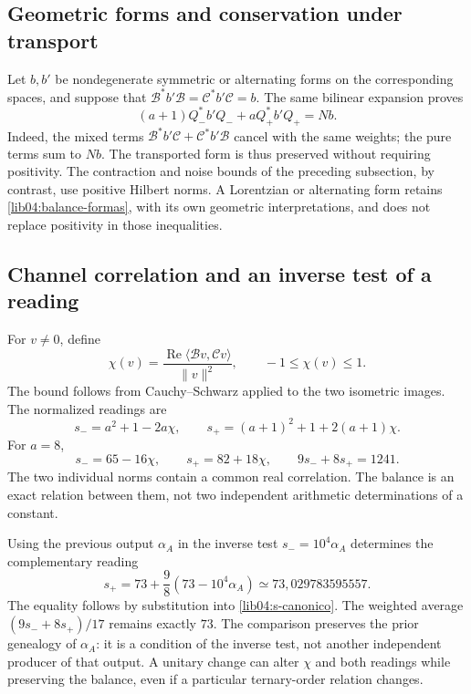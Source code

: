 \subsection{Geometric forms and conservation under transport}
\label{lib04:formas}

Let \(b,b'\) be nondegenerate symmetric or alternating forms on
the corresponding spaces, and suppose that
\(\mathcal B^*b'\mathcal B=\mathcal C^*b'\mathcal C=b\).
The same bilinear expansion proves
\begin{equation}
 (a+1)Q_-^*b'Q_-+aQ_+^*b'Q_+=Nb.
 \label{lib04:balance-formas}
\end{equation}
Indeed, the mixed terms
\(\mathcal B^*b'\mathcal C+\mathcal C^*b'\mathcal B\) cancel
with the same weights; the pure terms sum to \(Nb\).
The transported form is thus preserved without requiring positivity.
The contraction and noise bounds of the preceding subsection, by
contrast, use positive Hilbert norms. A Lorentzian or alternating
form retains \eqref{lib04:balance-formas}, with its own geometric
interpretations, and does not replace positivity in those
inequalities.

\subsection{Channel correlation and an inverse test of a reading}
\label{lib04:correlacion}

For \(v\neq0\), define
\begin{equation}
 \chi(v)=\frac{\operatorname{Re}\langle\mathcal Bv,\mathcal Cv\rangle}
                      {\|v\|^2},\qquad -1\leq\chi(v)\leq1.
 \label{lib04:chi}
\end{equation}
The bound follows from Cauchy--Schwarz applied to the two isometric images.
The normalized readings are
\begin{equation}
 s_-=a^2+1-2a\chi,\qquad
 s_+=(a+1)^2+1+2(a+1)\chi.
 \label{lib04:s-pm}
\end{equation}
For \(a=8\),
\begin{equation}
 s_-=65-16\chi,\qquad s_+=82+18\chi,\qquad
 9s_-+8s_+=1241.
 \label{lib04:s-canonico}
\end{equation}
The two individual norms contain a common real correlation. The
balance is an exact relation between them, not two independent
arithmetic determinations of a constant.

Using the previous output \(\alpha_A\) in the inverse test
\(s_-=10^4\alpha_A\) determines the complementary reading
\begin{equation}
 s_+=73+\frac98(73-10^4\alpha_A)
       \simeq73{,}029783595557.
 \label{lib04:ensayo-alpha}
\end{equation}
The equality follows by substitution into
\eqref{lib04:s-canonico}. The weighted average
\((9s_-+8s_+)/17\) remains exactly \(73\).
The comparison preserves the prior genealogy of \(\alpha_A\): it is
a condition of the inverse test, not another independent producer of
that output. A unitary change can alter \(\chi\) and both
readings while preserving the balance, even if a particular ternary-order
relation changes.

